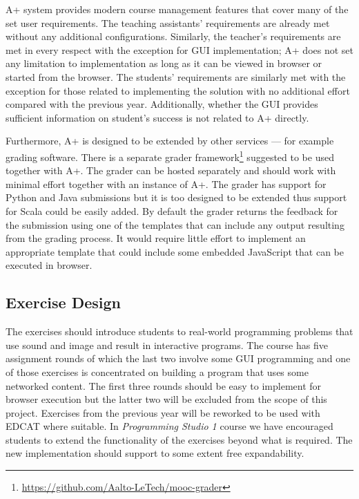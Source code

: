 A+ system provides modern course management features that cover many of the set user requirements. The teaching assistants' requirements are already met without any additional configurations. Similarly, the teacher's requirements are met in every respect with the exception for GUI implementation; A+ does not set any limitation to implementation as long as it can be viewed in browser or started from the browser. The students' requirements are similarly met with the exception for those related to implementing the solution with no additional effort compared with the previous year. Additionally, whether the GUI provides sufficient information on student's success is not related to A+ directly.

Furthermore, A+ is designed to be extended by other services --- for example grading software. There is a separate grader framework\footnote{ \url{https://github.com/Aalto-LeTech/mooc-grader}} suggested to be used together with A+. The grader can be hosted separately and should work with minimal effort together with an instance of A+. The grader has support for Python and Java submissions but it is too designed to be extended thus support for Scala could be easily added. By default the grader returns the feedback for the submission using one of the templates that can include any output resulting from the grading process. It would require little effort to implement an appropriate template that could include some embedded JavaScript that can be executed in browser.


\subsection{Exercise Design}
\label{subsection:exerciseDesign}

The exercises should introduce students to real-world programming problems that use sound and image and result in interactive programs. The course has five assignment rounds of which the last two involve some GUI programming and one of those exercises is concentrated on building a program that uses some networked content. The first three rounds should be easy to implement for browser execution but the latter two will be excluded from the scope of this project. Exercises from the previous year will be reworked to be used with EDCAT where suitable. In \emph{Programming Studio 1} course we have encouraged students to extend the functionality of the exercises beyond what is required. The new implementation should support to some extent free expandability.

